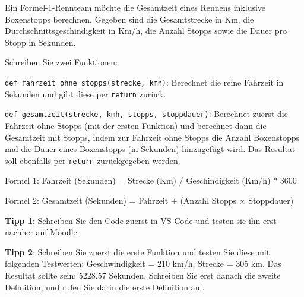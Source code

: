 \begin{myexercise}
	Ein Formel-1-Rennteam möchte die Gesamtzeit eines Rennens inklusive Boxenstopps berechnen. Gegeben sind die Gesamtstrecke in Km, die Durchschnittsgeschindigkeit in Km/h, die Anzahl Stopps sowie die Dauer pro Stopp in Sekunden.

	Schreiben Sie zwei Funktionen:

	\lstinline|def fahrzeit_ohne_stopps(strecke, kmh)|: Berechnet die reine Fahrzeit in Sekunden und gibt diese per \lstinline|return| zurück.

	\lstinline|def gesamtzeit(strecke, kmh, stopps, stoppdauer)|: Berechnet zuerst die Fahrzeit ohne Stopps (mit der ersten Funktion) und berechnet dann die Gesamtzeit mit Stopps, indem zur Fahrzeit ohne Stopps die Anzahl Boxenstopps mal die Dauer eines Boxenstopps (in Sekunden) hinzugefügt wird. Das Resultat soll ebenfalls per \lstinline|return| zurückgegeben werden.

	Formel 1: Fahrzeit (Sekunden) = Strecke (Km) / Geschindigkeit (Km/h) * 3600

	Formel 2: Gesamtzeit (Sekunden) = Fahrzeit + (Anzahl Stopps $\times$ Stoppdauer)

	\textbf{Tipp 1}: Schreiben Sie den Code zuerst in VS Code und testen sie ihn erst nachher auf Moodle.

	\textbf{Tipp 2}: Schreiben Sie zuerst die erste Funktion und testen Sie diese mit folgenden Testwerten: Geschwindigkeit = 210 km/h, Strecke = 305 km. Das Resultat sollte sein: 5228.57 Sekunden. Schreiben Sie erst danach die zweite Definition, und rufen Sie darin die erste Definition auf.

	\begin{myanswer}
		
	\end{myanswer}
\end{myexercise}

\clearpage
